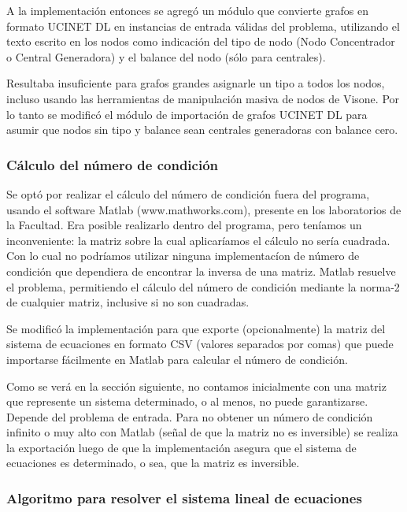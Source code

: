 A la implementaci\'on entonces se agreg\'o un m\'odulo que convierte grafos en formato UCINET DL en instancias de entrada v\'alidas del problema, utilizando el texto escrito en los nodos como indicaci\'on del tipo de nodo (Nodo Concentrador o Central Generadora) y el balance del nodo (s\'olo para centrales).

Resultaba insuficiente para grafos grandes asignarle un tipo a todos los nodos, incluso usando las herramientas de manipulaci\'on masiva de nodos de Visone. Por lo tanto se modific\'o el m\'odulo de importaci\'on de grafos UCINET DL para asumir que nodos sin tipo y balance sean centrales generadoras con balance cero.

\subsubsection{C\'alculo del n\'umero de condici\'on}

Se opt\'o por realizar el c\'alculo del n\'umero de condici\'on fuera del programa, usando el software Matlab (www.mathworks.com), presente en los laboratorios de la Facultad.
Era posible realizarlo dentro del programa, pero ten\'iamos un inconveniente: la matriz sobre la cual aplicar\'iamos el c\'alculo no ser\'ia cuadrada. Con lo cual no podr\'iamos utilizar ninguna implementac\'ion de n\'umero de condici\'on que dependiera de encontrar la inversa de una matriz.
Matlab resuelve el problema, permitiendo el c\'alculo del n\'umero de condici\'on mediante la norma-2 de cualquier matriz, inclusive si no son cuadradas.

Se modific\'o la implementaci\'on para que exporte (opcionalmente) la matriz del sistema de ecuaciones en formato CSV (valores separados por comas) que puede importarse f\'acilmente en Matlab para calcular el n\'umero de condici\'on.

Como se ver\'a en la secci\'on siguiente, no contamos inicialmente con una matriz que represente un sistema determinado, o al menos, no puede garantizarse. Depende del problema de entrada.
Para no obtener un n\'umero de condici\'on infinito o muy alto con Matlab (se\~nal de que la matriz no es inversible) se realiza la exportaci\'on luego de que la implementaci\'on asegura que el sistema de ecuaciones es determinado, o sea, que la matriz es inversible.

\subsubsection{Algoritmo para resolver el sistema lineal de ecuaciones}

